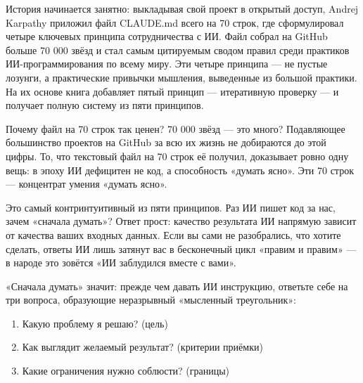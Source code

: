 

История начинается занятно: выкладывая свой проект в открытый доступ, Andrej Karpathy приложил файл CLAUDE.md всего на 70 строк, где сформулировал четыре ключевых принципа сотрудничества с ИИ. Файл собрал на GitHub больше 70 000 звёзд и стал самым цитируемым сводом правил среди практиков ИИ-программирования по всему миру. Эти четыре принципа — не пустые лозунги, а практические привычки мышления, выведенные из большой практики. На их основе книга добавляет пятый принцип — итеративную проверку — и получает полную систему из пяти принципов.

\begin{tcbinfo}{Почему файл на 70 строк так ценен?}
70 000 звёзд — это много? Подавляющее большинство проектов на GitHub за всю их жизнь не добираются до этой цифры. То, что текстовый файл на 70 строк её получил, доказывает ровно одну вещь: в эпоху ИИ дефицитен не код, а способность «думать ясно». Эти 70 строк — концентрат умения «думать ясно».

\end{tcbinfo}


Это самый контринтуитивный из пяти принципов. Раз ИИ пишет код за нас, зачем «сначала думать»? Ответ прост: качество результата ИИ напрямую зависит от качества ваших входных данных. Если вы сами не разобрались, что хотите сделать, ответы ИИ лишь затянут вас в бесконечный цикл «правим и правим» — в народе это зовётся «ИИ заблудился вместе с вами».

«Сначала думать» значит: прежде чем давать ИИ инструкцию, ответьте себе на три вопроса, образующие неразрывный «мысленный треугольник»:

\begin{enumerate}
  \item Какую проблему я решаю? (цель)
  \item Как выглядит желаемый результат? (критерии приёмки)
  \item Какие ограничения нужно соблюсти? (границы)
\end{enumerate}

